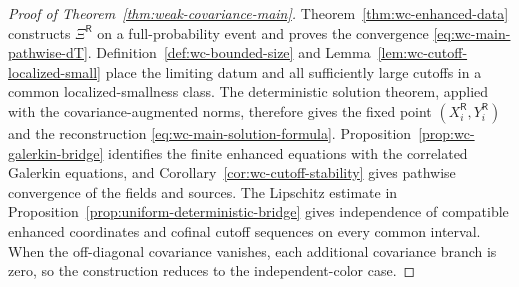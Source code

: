 \documentclass[10pt]{amsart}
\numberwithin{equation}{section}
\theoremstyle{plain}
\theoremstyle{definition}
\theoremstyle{remark}
\begin{document}
\begin{proof}[Proof of Theorem~\ref{thm:weak-covariance-main}]
Theorem~\ref{thm:wc-enhanced-data} constructs $\Xi^{\mathsf R}$ on a full-probability event and proves the convergence \eqref{eq:wc-main-pathwise-dT}.  Definition~\ref{def:wc-bounded-size} and Lemma~\ref{lem:wc-cutoff-localized-small} place the limiting datum and all sufficiently large cutoffs in a common localized-smallness class.  The deterministic solution theorem, applied with the covariance-augmented norms, therefore gives the fixed point $(X_i^{\mathsf R},Y_i^{\mathsf R})$ and the reconstruction \eqref{eq:wc-main-solution-formula}.  Proposition~\ref{prop:wc-galerkin-bridge} identifies the finite enhanced equations with the correlated Galerkin equations, and Corollary~\ref{cor:wc-cutoff-stability} gives pathwise convergence of the fields and sources.  The Lipschitz estimate in Proposition~\ref{prop:uniform-deterministic-bridge} gives independence of compatible enhanced coordinates and cofinal cutoff sequences on every common interval.  When the off-diagonal covariance vanishes, each additional covariance branch is zero, so the construction reduces to the independent-color case.
\end{proof}
\end{document}
